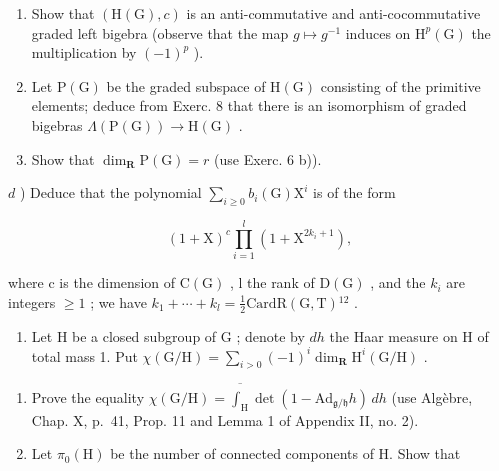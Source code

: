 \begin{enumerate}
\begin{enumerate}
\def\labelenumi{\alph{enumi})}
\item
  Show that \((\mathrm{H}(\mathrm{G}), c)\) is an anti-commutative and anti-cocommutative graded left bigebra (observe that the map \(g \mapsto g^{-1}\) induces on \(\mathrm{H}^{p}(\mathrm{G})\) the multiplication by \((-1)^{p}\) ).
\item
  Let \(\mathrm{P}(\mathrm{G})\) be the graded subspace of \(\mathrm{H}(\mathrm{G})\) consisting of the primitive elements; deduce from Exerc. 8 that there is an isomorphism of graded bigebras \(\Lambda(\mathrm{P}(\mathrm{G})) \to \mathrm{H}(\mathrm{G})\) .
\item
  Show that \(\dim_{\mathbf{R}}\mathrm{P}(\mathrm{G})=r\) (use Exerc. 6 b)).
\end{enumerate}

\(d\) ) Deduce that the polynomial \(\sum_{i\geq 0}b_i(\mathrm{G})\mathrm{X}^i\) is of the form

\[
(1 + \mathrm{X}) ^ {c} \prod_ {i = 1} ^ {l} (1 + \mathrm{X} ^ {2 k _ {i} + 1}),
\]

where c is the dimension of \(\mathrm{C}(\mathrm{G})\) , l the rank of \(\mathrm{D}(\mathrm{G})\) , and the \(k_{i}\) are integers \(\geq 1\) ; we have \(k_{1} + \cdots + k_{l} = \frac{1}{2}\mathrm{Card}\mathrm{R}(\mathrm{G},\mathrm{T})\)\(^{12}\) .


\begin{enumerate}
\def\labelenumi{\arabic{enumi})}
\setcounter{enumi}{9}
\tightlist
\item
  Let \(\mathrm{H}\) be a closed subgroup of \(\mathrm{G}\) ; denote by \(dh\) the Haar measure on \(\mathrm{H}\) of total mass 1. Put \(\chi(\mathrm{G} / \mathrm{H}) = \sum_{i > 0} (-1)^i \dim_{\mathbf{R}} \mathrm{H}^i (\mathrm{G} / \mathrm{H})\) .
\end{enumerate}

\begin{enumerate}
\def\labelenumi{\alph{enumi})}
\item
  Prove the equality \(\chi(\mathrm{G}/\mathrm{H})=\overline{\int_{\mathrm{H}}}\det(1-\mathrm{Ad}_{\mathfrak{g}/\mathfrak{h}}h)\,dh\) (use Algèbre, Chap. X, p.~41, Prop. 11 and Lemma 1 of Appendix II, no. 2).
\item
  Let \(\pi_{0}(\mathrm{H})\) be the number of connected components of H. Show that
\end{enumerate}


\end{enumerate}
